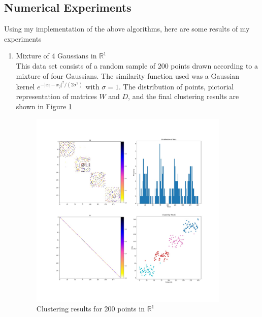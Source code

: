 \documentclass[10pt,a4paper, nocenter]{report}
\newcommand{\abs}[1]{\lvert {#1} \rvert}
\begin{document}
    \subsection{Numerical Experiments}

    Using my implementation of the above algorithms, here are some results of my experiments

    \begin{enumerate}
        \item{Mixture of 4 Gaussians in $\mathbb{R}^1$}\\
        This data set consists of a random sample of 200 points drawn according to a mixture of four Gaussians. The similarity function used was a Gaussian kernel $e^{-\abs{x_i - x_j}^2/(2\sigma^2)}$ with $\sigma = 1$. The distribution of points, pictorial representation of matrices $W$ and $D$, and the final clustering results are shown in Figure \ref{fig:1dresults}

        \begin{figure}[h]
        \includegraphics[width=0.9\textwidth]{../../images/1DCluster.jpg}
        \caption{Clustering results for 200 points in $\mathbb{R}^1$}
        \label{fig:1dresults}
        \end{figure}


\end{enumerate}
\end{document}
